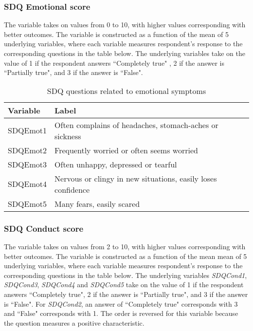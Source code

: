\subsubsection{SDQ Emotional score}
The variable takes on values from 0 to 10, with higher values corresponding with better outcomes. The variable is constructed as a function of the mean of 5 underlying variables, where each variable measures respondent's response to the corresponding questions in the table below. The underlying variables take on the value of 1 if the respondent answers  ``Completely true" , 2 if the answer is ``Partially true", and 3 if the answer is ``False". \\

\begin{table}[H]
\begin{center}
\footnotesize{
\caption{SDQ questions related to emotional symptoms}
\begin{tabular}{l l}
\hline
\textbf{Variable} & \textbf{Label} \\
\hline
SDQEmot1 & Often complains of headaches, stomach-aches or sickness\\
SDQEmot2 & Frequently worried or often seems worried\\
SDQEmot3 & Often unhappy, depressed or tearful\\
SDQEmot4 & Nervous or clingy in new situations, easily loses confidence\\
SDQEmot5 & Many fears, easily scared\\
\hline
\end{tabular}
}
\end{center}
\end{table}

\subsubsection{SDQ Conduct score}
The variable takes on values from 2 to 10, with higher values corresponding with better outcomes. The variable is constructed as a function of the mean mean of 5 underlying variables, where each variable measures respondent's response to the corresponding questions in the table below. The underlying variables \textit{SDQCond1}, \textit{SDQCond3}, \textit{SDQCond4} and \textit{SDQCond5} take on the value of 1 if the respondent answers  ``Completely true", 2 if the answer is ``Partially true", and 3 if the answer is ``False". For \textit{SDQCond2}, an answer of ``Completely true" corresponds with 3 and ``False" corresponds with 1. The order is reversed for this variable because the question measures a positive characteristic. \\

